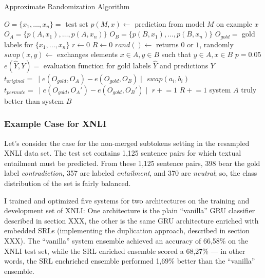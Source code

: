 \begin{algorithm}
\caption{Approximate Randomization Algorithm}
\label{alg:approximate-randomization}
	\begin{algorithmic}[1]
    \STATE $O = \{x_1, \dotsc, x_n\} =$ test set
    \STATE $p(M,x) \leftarrow$ prediction from model $M$ on example $x$
    \STATE $O_A = \{p(A,x_1), \dotsc, p(A,x_n)\}$
    \STATE $O_B = \{p(B,x_1), \dotsc, p(B,x_n)\}$
    \STATE $O_{gold} =$ gold labels for $\{x_1, \dotsc, x_n\}$
    \STATE $r \leftarrow 0$
    \STATE $R \leftarrow 0$
    \STATE $rand() \leftarrow$ returns $0$ or $1$, randomly
    \STATE $swap(x,y) \leftarrow$ exchanges elements $x \in A,y \in B$ such that $y \in A, x \in B$
    \STATE $p = 0.05$
    \STATE $e(\hat{Y},Y) =$ evaluation function for gold labels $\hat{Y}$ and predictions $Y$
    \STATE $t_{original} =\ \mid e(O_{gold},O_A) - e(O_{gold},O_B) \mid$
          \STATE $swap(a_i,b_i)$
        \ENDIF
      \ENDFOR
      \STATE $t_{permute} =\ \mid e(O_{gold},O_A') - e(O_{gold},O_B') \mid$
        \STATE $r \mathrel{+}= 1$
      \ENDIF
      \STATE $R \mathrel{+}= 1$
    \ENDWHILE
      \STATE system $A$ truly better than system $B$
    \ENDIF
  \end{algorithmic}
\end{algorithm}


\subsubsection{Example Case for XNLI}


Let's consider the case for the non-merged subtokens setting in the resampled XNLI data set. The test
set contains 1,125 sentence pairs for which textual entailment must be predicted. From these 1,125
sentence pairs, 398 bear the gold label \emph{contradiction}, 357 are labeled \emph{entailment},
and 370 are \emph{neutral}; so, the class distribution of the set is fairly balanced.

I trained and optimized five systems for two architectures on the training and development set
of XNLI: One architecture is the plain ``vanilla'' GRU classifier described in section XXX, the
other is the same GRU architecture enriched with embedded SRLs (implementing the duplication
approach, described in section XXX). The ``vanilla'' system ensemble achieved an accuracy of
66,58\% on the XNLI test set, while the SRL enriched ensemble scored a 68,27\% --- in other
words, the SRL enchriched ensemble performed 1,69\% better than the ``vanilla'' ensemble.

